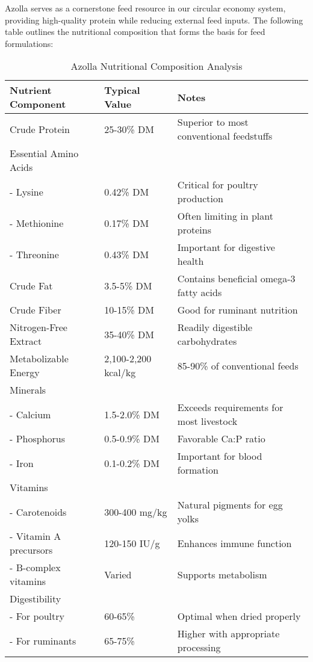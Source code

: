 Azolla serves as a cornerstone feed resource in our circular economy system, providing high-quality protein while reducing external feed inputs. The following table outlines the nutritional composition that forms the basis for feed formulations:

\begin{table}[h]
\centering
\caption{Azolla Nutritional Composition Analysis}
\label{tab:azolla_nutrition}
\begin{tabular}{|p{4cm}|p{3cm}|p{5cm}|}
\hline
\textbf{Nutrient Component} & \textbf{Typical Value} & \textbf{Notes} \\
\hline
Crude Protein & 25-30\% DM & Superior to most conventional feedstuffs \\
\hline
Essential Amino Acids & & \\
- Lysine & 0.42\% DM & Critical for poultry production \\
- Methionine & 0.17\% DM & Often limiting in plant proteins \\
- Threonine & 0.43\% DM & Important for digestive health \\
\hline
Crude Fat & 3.5-5\% DM & Contains beneficial omega-3 fatty acids \\
\hline
Crude Fiber & 10-15\% DM & Good for ruminant nutrition \\
\hline
Nitrogen-Free Extract & 35-40\% DM & Readily digestible carbohydrates \\
\hline
Metabolizable Energy & 2,100-2,200 kcal/kg & 85-90\% of conventional feeds \\
\hline
Minerals & & \\
- Calcium & 1.5-2.0\% DM & Exceeds requirements for most livestock \\
- Phosphorus & 0.5-0.9\% DM & Favorable Ca:P ratio \\
- Iron & 0.1-0.2\% DM & Important for blood formation \\
\hline
Vitamins & & \\
- Carotenoids & 300-400 mg/kg & Natural pigments for egg yolks \\
- Vitamin A precursors & 120-150 IU/g & Enhances immune function \\
- B-complex vitamins & Varied & Supports metabolism \\
\hline
Digestibility & & \\
- For poultry & 60-65\% & Optimal when dried properly \\
- For ruminants & 65-75\% & Higher with appropriate processing \\
\hline
\end{tabular}
\end{table}

